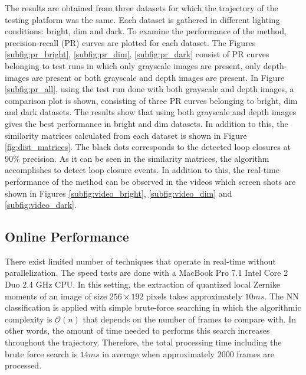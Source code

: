 \documentclass[]{spie}  %
\begin{document}
The results are obtained from three datasets for which the trajectory of the testing platform was the same. Each dataset is gathered in different lighting conditions: bright, dim and dark.
To examine the performance of the method, precision-recall (PR) curves are plotted for each dataset. The Figures \ref{subfig:pr_bright}, \ref{subfig:pr_dim}, \ref{subfig:pr_dark} consist of PR curves belonging to test runs in which only grayscale images are present, only depth-images are present or both grayscale and depth images are present. In Figure \ref{subfig:pr_all}, using the test run done with both grayscale and depth images, a comparison plot is shown, consisting of three PR curves belonging to bright, dim and dark datasets. The results show that using both grayscale and depth images gives the best performance in bright and dim datasets. In addition to this, the similarity matrices calculated from each dataset is shown in Figure \ref{fig:dist_matrices}. The black dots corresponds to the detected loop closures at $90\%$ precision. As it can be seen in the similarity matrices, the algorithm accomplishes to detect loop closure events. In addition to this, the real-time performance of the method can be observed in the videos which screen shots are shown in Figures \ref{subfig:video_bright}, \ref{subfig:video_dim} and \ref{subfig:video_dark}.


\subsection{Online Performance}

There exist limited number of techniques that operate in real-time without parallelization. The speed tests are done with a MacBook Pro 7.1 Intel Core 2 Duo 2.4 GHz CPU. In this setting, the extraction of quantized local Zernike moments of an image of size $256\times 192$ pixels takes approximately $10ms$. The NN classification is applied with simple brute-force searching in which the algorithmic complexity is $\mathcal{O}(n)$ that depends on the number of frames to compare with. In other words, the amount of time needed to performs this search increases throughout the trajectory. Therefore, the total processing time including the brute force search is $14ms$ in average when approximately 2000 frames are processed.
\end{document}
